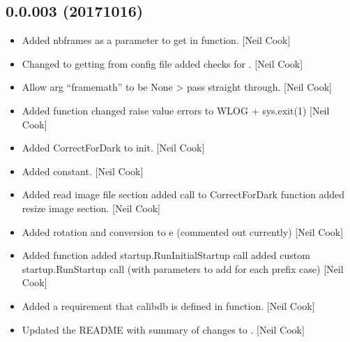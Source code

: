 \documentclass[a4paper,10pt,english]{report}
\begin{document}
\subsection{0.0.003 (2017\sphinxhyphen{}10\sphinxhyphen{}16)}
\label{\detokenize{misc/changelog:id567}}\begin{itemize}
\item {} 
Added nbframes as a parameter to get in  function. {[}Neil
Cook{]}

\item {} 
Changed  to getting from config file added checks for
. {[}Neil Cook{]}

\item {} 
Allow  arg “framemath” to be None \textendash{}\textgreater{} pass straight
through. {[}Neil Cook{]}

\item {} 
Added  function changed raise value errors to WLOG +
sys.exit(1) {[}Neil Cook{]}

\item {} 
Added CorrectForDark to init. {[}Neil Cook{]}

\item {} 
Added  constant. {[}Neil Cook{]}

\item {} 
Added read image file section added call to CorrectForDark function
added resize image section. {[}Neil Cook{]}

\item {} 
Added rotation and conversion to e\sphinxhyphen{} (commented out currently) {[}Neil
Cook{]}

\item {} 
Added  function added startup.RunInitialStartup call added
custom startup.RunStartup call (with parameters to add for each prefix
case) {[}Neil Cook{]}

\item {} 
Added a requirement that calibdb is defined in  function.
{[}Neil Cook{]}

\item {} 
Updated the README with summary of changes to .
{[}Neil Cook{]}

\end{itemize}
\end{document}

